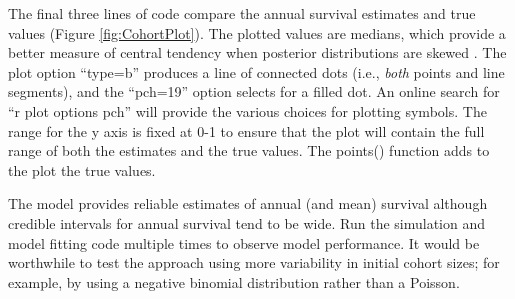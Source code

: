 \documentclass[
]{krantz}
\makeatletter
\newenvironment{Shaded}{\begin{snugshade}}{\end{snugshade}}
\newcommand{\AttributeTok}[1]{\textcolor[rgb]{0.27,0.27,0.27}{#1}}
\newcommand{\CommentTok}[1]{\textcolor[rgb]{0.37,0.37,0.37}{\textit{#1}}}
\newcommand{\DecValTok}[1]{\textcolor[rgb]{0.06,0.06,0.06}{#1}}
\newcommand{\FunctionTok}[1]{\textcolor[rgb]{0.27,0.27,0.27}{\textbf{#1}}}
\newcommand{\NormalTok}[1]{#1}
\newcommand{\OtherTok}[1]{\textcolor[rgb]{0.37,0.37,0.37}{#1}}
\newcommand{\SpecialCharTok}[1]{\textcolor[rgb]{0.43,0.43,0.43}{\textbf{#1}}}
\newcommand{\StringTok}[1]{\textcolor[rgb]{0.5,0.5,0.5}{#1}}
\newenvironment{kframe}{%
\medskip{}
\setlength{\fboxsep}{.8em}
 \def\at@end@of@kframe{}%
 \ifinner\ifhmode%
  \def\at@end@of@kframe{\end{minipage}}%
  \begin{minipage}{\columnwidth}%
 \fi\fi%
 \def\FrameCommand##1{\hskip\@totalleftmargin \hskip-\fboxsep
 \colorbox{shadecolor}{##1}\hskip-\fboxsep
     \hskip-\linewidth \hskip-\@totalleftmargin \hskip\columnwidth}%
 \MakeFramed {\advance\hsize-\width
   \@totalleftmargin\z@ \linewidth\hsize
   \@setminipage}}%
 {\par\unskip\endMakeFramed%
 \at@end@of@kframe}
\renewenvironment{Shaded}{\begin{kframe}}{\end{kframe}}
\makeatother
\begin{document}
\begin{Shaded}
\end{Shaded}

The final three lines of code compare the annual survival estimates and true values (Figure \ref{fig:CohortPlot}). The plotted values are medians, which provide a better measure of central tendency when posterior distributions are skewed \citep{kruschke_2021}. The plot option ``type=b'' produces a line of connected dots (i.e., \emph{both} points and line segments), and the ``pch=19'' option selects for a filled dot. An online search for ``r plot options pch'' will provide the various choices for plotting symbols. The range for the y axis is fixed at 0-1 to ensure that the plot will contain the full range of both the estimates and the true values. The points() function adds to the plot the true values.

The model provides reliable estimates of annual (and mean) survival although credible intervals for annual survival tend to be wide. Run the simulation and model fitting code multiple times to observe model performance. It would be worthwhile to test the approach using more variability in initial cohort sizes; for example, by using a negative binomial distribution rather than a Poisson.
\end{document}
